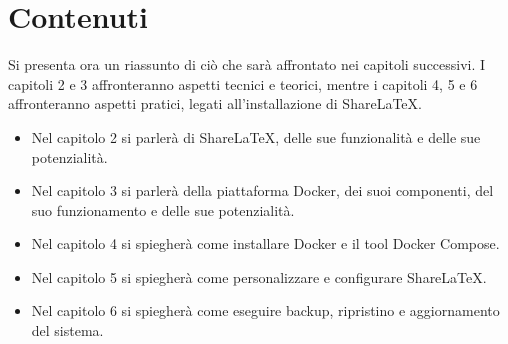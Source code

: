 \section{Contenuti}
Si presenta ora un riassunto di ciò che sarà affrontato nei capitoli successivi. I capitoli 2 e 3 affronteranno aspetti tecnici e teorici, mentre i capitoli 4, 5 e 6 affronteranno aspetti pratici, legati all'installazione di ShareLaTeX.
\begin{itemize}
    \item Nel capitolo 2 si parlerà di ShareLaTeX, delle sue funzionalità e delle sue potenzialità.
    \item Nel capitolo 3 si parlerà della piattaforma Docker, dei suoi componenti, del suo funzionamento e delle sue potenzialità.
    \item Nel capitolo 4 si spiegherà come installare Docker e il tool Docker Compose.
    \item Nel capitolo 5 si spiegherà come personalizzare e configurare ShareLaTeX.
    \item Nel capitolo 6 si spiegherà come eseguire backup, ripristino e aggiornamento del sistema.
\end{itemize}